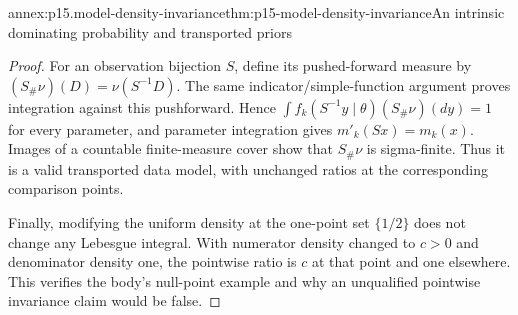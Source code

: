 \begin{annexitem}{annex:p15.model-density-invariance}{thm:p15-model-density-invariance}{An intrinsic dominating probability and transported priors}
\begin{proof}
For an observation bijection \(S\), define its pushed-forward measure by
\((S_\#\nu)(D)=\nu(S^{-1}D)\). The same indicator/simple-function
argument proves integration against this pushforward. Hence
\(\int f_k(S^{-1}y\mid\theta)(S_\#\nu)(dy)=1\) for every parameter,
and parameter integration gives \(m'_k(Sx)=m_k(x)\).
Images of a countable finite-measure cover show that \(S_\#\nu\) is
sigma-finite. Thus it is a valid transported data model, with unchanged
ratios at the corresponding comparison points.

Finally, modifying the uniform density at the one-point set \(\{1/2\}\)
does not change any Lebesgue integral. With numerator density changed to
\(c>0\) and denominator density one, the pointwise ratio is \(c\) at
that point and one elsewhere. This verifies the body's null-point example
and why an unqualified pointwise invariance claim would be false.
\end{proof}
\end{annexitem}

